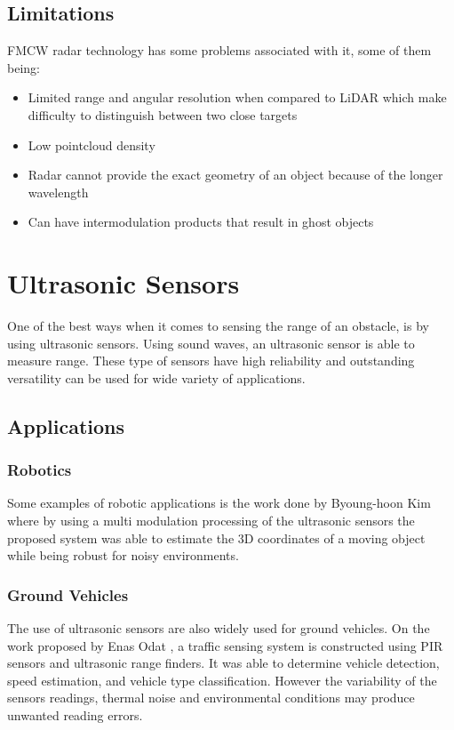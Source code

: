  
\subsection{Limitations}
\ac{FMCW} {radar} technology has some problems associated with it, some of them being:
\begin{itemize}
\item{Limited range and angular resolution when compared to \ac{LiDAR} which make difficulty to distinguish between two close targets}  
\item{Low pointcloud density}  
\item{Radar cannot provide the exact geometry of an object because of the longer wavelength}  
\item{Can have intermodulation products that result in ghost objects} 
\end{itemize}


\section{Ultrasonic Sensors}
One of the best ways when it comes to  sensing the range of an obstacle, is by using ultrasonic sensors. Using sound waves, an ultrasonic sensor is able to measure range. 
These type of sensors have high reliability and outstanding versatility can be used for wide variety of applications. 

\subsection{Applications}
\subsubsection{Robotics}
Some examples of robotic applications is the work done by Byoung-hoon Kim \cite{kim2006improved} where by using a multi modulation processing of the ultrasonic sensors the proposed system was able to estimate the 3D coordinates of a moving object while being robust for noisy environments.
\subsubsection{Ground Vehicles}
The use of ultrasonic sensors are also widely used for ground vehicles. On the work  proposed by Enas Odat \cite{pir}, a traffic sensing system is constructed using \ac{PIR} sensors and ultrasonic range finders. It was able to determine  vehicle detection, speed estimation, and vehicle type classification. However the variability of the sensors readings, thermal noise and environmental conditions may produce unwanted reading errors.
